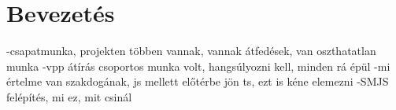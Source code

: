 \chapter*{Bevezetés}

-csapatmunka, projekten többen vannak, vannak átfedések, van oszthatatlan munka
-vpp átírás csoportos munka volt, hangsúlyozni kell, minden rá épül
-mi értelme van szakdogának, js mellett előtérbe jön ts, ezt is kéne elemezni
-SMJS felépítés, mi ez, mit csinál